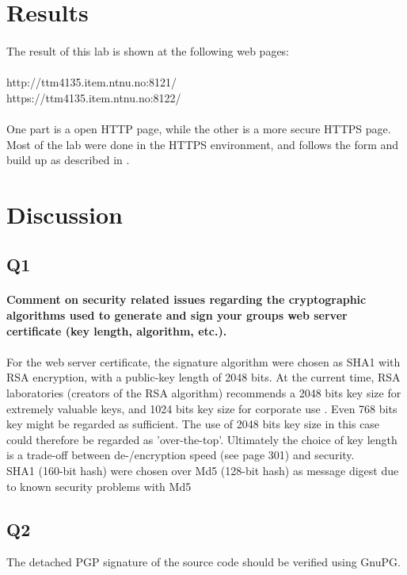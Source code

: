 \documentclass[a4paper,11pt]{article}
\begin{document}
\section{Results}
\paragraph{}The result of this lab is shown at the following web pages:\\
\\
http://ttm4135.item.ntnu.no:8121/\\
https://ttm4135.item.ntnu.no:8122/\\
\\
One part is a open HTTP page, while the other is a more secure HTTPS page. Most of the lab were done in the HTTPS environment, and follows the form and build up as described in \cite{1}.
\section{Discussion}
\subsection{Q1}
\paragraph{Comment on security related issues regarding the cryptographic algorithms used to
generate and sign your groups web server certiﬁcate (key length, algorithm, etc.).}
\paragraph{} For the web server certificate, the signature algorithm were chosen as SHA1 with RSA encryption, with a public-key length of 2048 bits. At the current time, RSA laboratories (creators of the RSA algorithm) recommends a 2048 bits key size for extremely valuable keys, and 1024 bits key size for corporate use \cite{2}. Even 768 bits key might be regarded as sufficient. The use of 2048 bits key size in this case could therefore be regarded as 'over-the-top'. Ultimately the choice of key length is a trade-off between de-/encryption speed (see \cite{5} page 301) and security.\\
SHA1 (160-bit hash) were chosen over Md5 (128-bit hash) as message digest due to known security problems with Md5 \cite{3}
\subsection{Q2}
The detached PGP signature of the source code should be verified using GnuPG.
\end{document}

